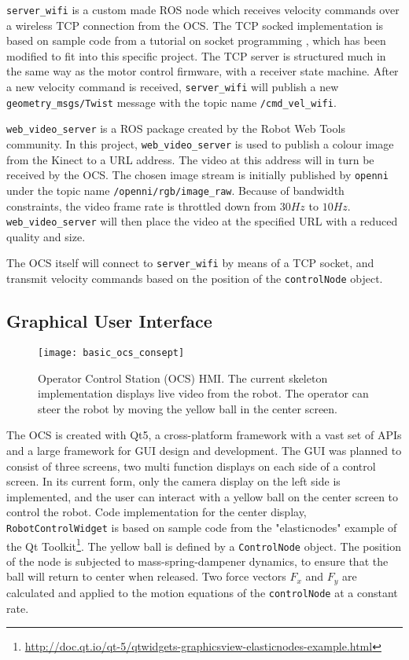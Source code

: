 \texttt{server\_wifi} is a custom made \ac{ROS} node which receives velocity commands over a wireless TCP connection from the \ac{OCS}. The TCP socked implementation is based on sample code from a tutorial on socket programming \cite{tcp_tut}, which has been modified to fit into this specific project. The TCP server is structured much in the same way as the motor control firmware, with a receiver state machine. After a new velocity command is received, \texttt{server\_wifi} will publish a new \texttt{geometry\_msgs/Twist} message with the topic name \texttt{/cmd\_vel\_wifi}.

\texttt{web\_video\_server} is a \ac{ROS} package created by the Robot Web Tools community. In this project, \texttt{web\_video\_server} is used to publish a colour image from the Kinect to a URL address. The video at this address will in turn be received by the \ac{OCS}. The chosen image stream is initially published by \texttt{openni} under the topic name \texttt{/openni/rgb/image\_raw}. Because of bandwidth constraints, the video frame rate is throttled down from $30 Hz$ to $10 Hz$.  \texttt{web\_video\_server} will then place the video at the specified URL with a reduced quality and size. 

The \ac{OCS} itself will connect to \texttt{server\_wifi} by means of a TCP socket, and transmit velocity commands based on the position of the \texttt{controlNode} object.

\subsection{Graphical User Interface}

\begin{figure}[H]
	\centering
	\texttt{[image: basic\_ocs\_consept]}
	\caption{Operator Control Station (OCS) \ac{HMI}. The current skeleton implementation displays live video from the robot. The operator can steer the robot by moving the yellow ball in the center screen. }
	\label{fig:ocs}
\end{figure}


The \ac{OCS} is created with Qt5, a cross-platform framework with a vast set of APIs and a large framework for \ac{GUI} design and development. The \ac{GUI} was planned to consist of three screens, two multi function displays on each side of a control screen. In its current form, only the camera display on the left side is implemented, and the user can interact with a yellow ball on the center screen to control the robot. Code implementation for the center display, \texttt{RobotControlWidget} is based on sample code from the "elasticnodes" example of the Qt Toolkit\footnote{\url{http://doc.qt.io/qt-5/qtwidgets-graphicsview-elasticnodes-example.html}}. The yellow ball is defined by a \texttt{ControlNode} object. The position of the node is subjected to mass-spring-dampener dynamics, to ensure that the ball will return to center when released. Two force vectors $F_x$ and $F_y$ are calculated and applied to the motion equations of the \texttt{controlNode} at a constant rate.  


